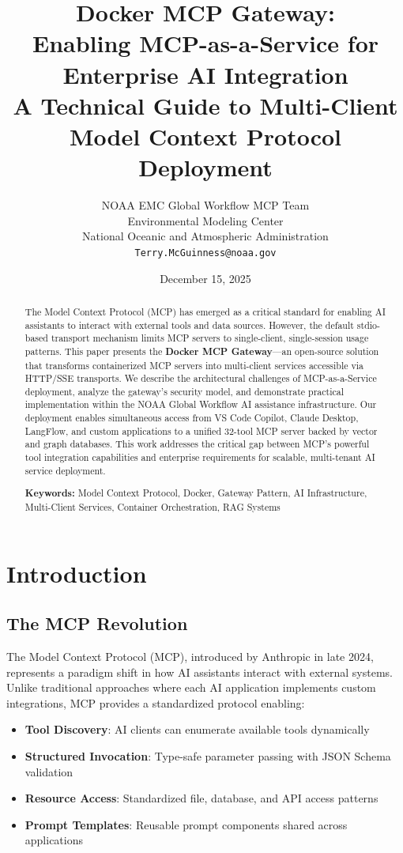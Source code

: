 \documentclass[11pt,letterpaper]{article}
\title{\textbf{Docker MCP Gateway:} \\
       \textbf{Enabling MCP-as-a-Service for Enterprise AI Integration} \\[0.5em]
       \large A Technical Guide to Multi-Client Model Context Protocol Deployment}
\author{
    NOAA EMC Global Workflow MCP Team \\
    Environmental Modeling Center \\
    National Oceanic and Atmospheric Administration \\
    \texttt{Terry.McGuinness@noaa.gov}
}
\date{December 15, 2025}
\begin{document}
\maketitle

\begin{abstract}
The Model Context Protocol (MCP) has emerged as a critical standard for enabling AI assistants to interact with external tools and data sources. However, the default stdio-based transport mechanism limits MCP servers to single-client, single-session usage patterns. This paper presents the \textbf{Docker MCP Gateway}---an open-source solution that transforms containerized MCP servers into multi-client services accessible via HTTP/SSE transports. We describe the architectural challenges of MCP-as-a-Service deployment, analyze the gateway's security model, and demonstrate practical implementation within the NOAA Global Workflow AI assistance infrastructure. Our deployment enables simultaneous access from VS Code Copilot, Claude Desktop, LangFlow, and custom applications to a unified 32-tool MCP server backed by vector and graph databases. This work addresses the critical gap between MCP's powerful tool integration capabilities and enterprise requirements for scalable, multi-tenant AI service deployment.

\textbf{Keywords:} Model Context Protocol, Docker, Gateway Pattern, AI Infrastructure, Multi-Client Services, Container Orchestration, RAG Systems
\end{abstract}

\section{Introduction}

\subsection{The MCP Revolution}

The Model Context Protocol (MCP), introduced by Anthropic in late 2024, represents a paradigm shift in how AI assistants interact with external systems. Unlike traditional approaches where each AI application implements custom integrations, MCP provides a standardized protocol enabling:

\begin{itemize}[noitemsep]
    \item \textbf{Tool Discovery}: AI clients can enumerate available tools dynamically
    \item \textbf{Structured Invocation}: Type-safe parameter passing with JSON Schema validation
    \item \textbf{Resource Access}: Standardized file, database, and API access patterns
    \item \textbf{Prompt Templates}: Reusable prompt components shared across applications
\end{itemize}
\end{document}
